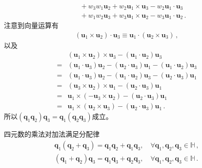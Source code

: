 \begin{prove}
\begin{align}
                                      & \quad +w_3w_1{\bm u}_2+w_2{\bm u}_1\times{\bm u}_3-w_2{\bm u}_1\cdot{\bm u}_3\nonumber                                                              \\
                                      & \quad +w_1w_2{\bm u}_3+w_3{\bm u}_1\times{\bm u}_2-w_3{\bm u}_1\cdot{\bm u}_2\, .
    \end{align}
    注意到向量运算有
    \begin{align}
        ({\bm u}_1\times{\bm u}_2)\cdot{\bm u}_3\equiv{\bm u}_1\cdot({\bm u}_2\times{\bm u}_3)\, ,
    \end{align}
    以及
    \begin{align}
          & ({\bm u}_1\times{\bm u}_2)\times{\bm u}_3-({\bm u}_1\cdot{\bm u}_2){\bm u}_3\nonumber                             \\
        = & ({\bm u}_1\cdot{\bm u}_3){\bm u}_2-({\bm u}_2\cdot{\bm u}_3){\bm u}_1-({\bm u}_1\cdot{\bm u}_2){\bm u}_3\nonumber \\
        = & ({\bm u}_1\cdot{\bm u}_3){\bm u}_2-({\bm u}_1\cdot{\bm u}_2){\bm u}_3-({\bm u}_2\cdot{\bm u}_3){\bm u}_1\nonumber \\
        = & ({\bm u}_3\times{\bm u}_2)\times{\bm u}_1-({\bm u}_2\cdot{\bm u}_3){\bm u}_1\nonumber                             \\
        = & {\bm u}_1\times(-{\bm u}_3\times{\bm u}_2)-({\bm u}_2\cdot{\bm u}_3){\bm u}_1\nonumber                            \\
        = & {\bm u}_1\times({\bm u}_2\times{\bm u}_3)-({\bm u}_2\cdot{\bm u}_3){\bm u}_1\, .
    \end{align}
    所以$({\bm q}_1{\bm q}_2){\bm q}_3={\bm q}_1({\bm q}_2{\bm q}_3)$成立。
\end{prove}
\begin{proposition}
    四元数的乘法对加法满足分配律
    \begin{align}
        {\bm q}_1({\bm q}_2+{\bm q}_3)={\bm q}_1{\bm q}_2+{\bm q}_1{\bm q}_3, \quad \forall {\bm q}_1, {\bm q}_2, {\bm q}_3\in \mathbb{H}\, , \\
        ({\bm q}_1+{\bm q}_2){\bm q}_3={\bm q}_1{\bm q}_3+{\bm q}_2{\bm q}_3, \quad \forall {\bm q}_1, {\bm q}_2, {\bm q}_3\in \mathbb{H}\, .
    \end{align}
\end{proposition}
